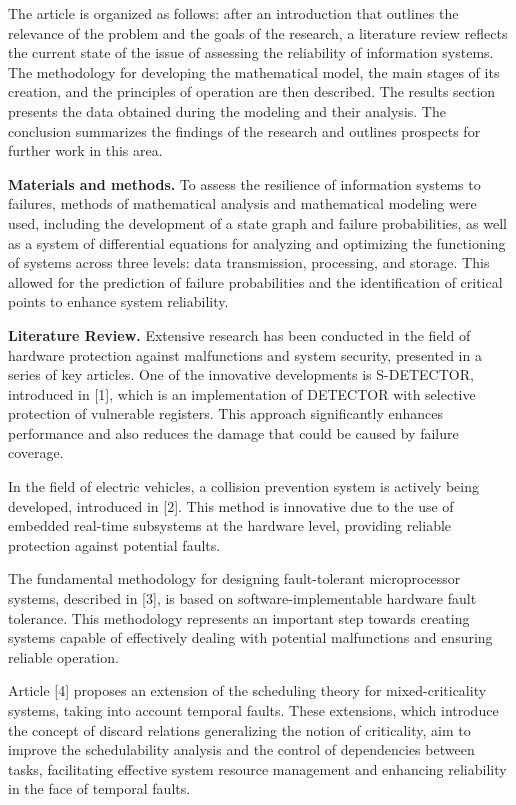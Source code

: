 \begin{multicols}{2}
The article is organized as follows: after an introduction that outlines
the relevance of the problem and the goals of the research, a literature
review reflects the current state of the issue of assessing the
reliability of information systems. The methodology for developing the
mathematical model, the main stages of its creation, and the principles
of operation are then described. The results section presents the data
obtained during the modeling and their analysis. The conclusion
summarizes the findings of the research and outlines prospects for
further work in this area.

{\bfseries Materials and methods.} To assess the resilience of information
systems to failures, methods of mathematical analysis and mathematical
modeling were used, including the development of a state graph and
failure probabilities, as well as a system of differential equations for
analyzing and optimizing the functioning of systems across three levels:
data transmission, processing, and storage. This allowed for the
prediction of failure probabilities and the identification of critical
points to enhance system reliability.

{\bfseries Literature Review.} Extensive research has been conducted in the
field of hardware protection against malfunctions and system security,
presented in a series of key articles. One of the innovative
developments is S-DETECTOR, introduced in {[}1{]}, which is an
implementation of DETECTOR with selective protection of vulnerable
registers. This approach significantly enhances performance and also
reduces the damage that could be caused by failure coverage.

In the field of electric vehicles, a collision prevention system is
actively being developed, introduced in {[}2{]}. This method is
innovative due to the use of embedded real-time subsystems at the
hardware level, providing reliable protection against potential faults.

The fundamental methodology for designing fault-tolerant microprocessor
systems, described in {[}3{]}, is based on software-implementable
hardware fault tolerance. This methodology represents an important step
towards creating systems capable of effectively dealing with potential
malfunctions and ensuring reliable operation.

Article {[}4{]} proposes an extension of the scheduling theory for
mixed-criticality systems, taking into account temporal faults. These
extensions, which introduce the concept of discard relations
generalizing the notion of criticality, aim to improve the
schedulability analysis and the control of dependencies between tasks,
facilitating effective system resource management and enhancing
reliability in the face of temporal faults.


\end{multicols}
